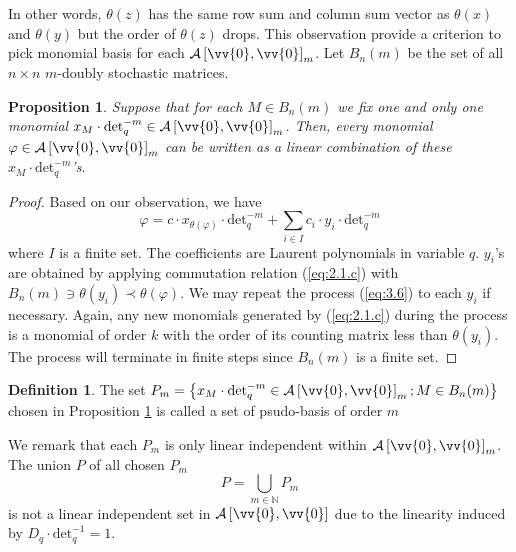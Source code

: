 \documentclass[table,a4paper,reqno]{amsart}
\numberwithin{equation}{section}
\newtheorem{proposition}[theorem]{Proposition}
\theoremstyle{definition}
\newtheorem{definition}[theorem]{Definition}
\begin{document}
\noindent In other words, $\theta(z)$ has the same row sum and column sum vector as $\theta(x)$ and $\theta(y)$ but the order of $\theta(z)$ drops. This observation provide a criterion to pick monomial basis for each $\mathcal{A}\left[\vv{0},\vv{0}\right]_m$. Let $B_n(m)$ be the set of all $n\times n$ $m$-doubly stochastic matrices.
\begin{proposition}\label{prop:3.5}
    Suppose that for each $M\in B_n(m)$ we fix one and only one monomial $x_M\cdot\text{det}_q^{-m}\in \mathcal{A}\left[\vv{0},\vv{0}\right]_m$. Then, every monomial $\varphi\in \mathcal{A}\left[\vv{0},\vv{0}\right]_m$ can be written as a linear combination of these $x_M\cdot\text{det}_q^{-m}$'s.
\end{proposition}
\begin{proof}
    Based on our observation, we have
    \begin{equation}\label{eq:3.6}
        \varphi=c\cdot x_{\theta(\varphi)}\cdot\text{det}_q^{-m}+\sum_{i\in I}c_i\cdot y_i\cdot\text{det}_q^{-m}
    \end{equation}
    where $I$ is a finite set. The coefficients are Laurent polynomials in variable $q$. $y_i$'s are obtained by applying commutation relation (\ref{eq:2.1.c}) with $B_n(m)\ni\theta(y_i)\prec\theta(\varphi)$. We may repeat the process (\ref{eq:3.6}) to each $y_i$ if necessary. Again, any new monomials generated by (\ref{eq:2.1.c}) during the process is a monomial of order $k$ with the order of its counting matrix less than $\theta(y_i)$. The process will terminate in finite steps since $B_n(m)$ is a finite set.
\end{proof}
\begin{definition}\label{def:3.6}
    The set $P_m=\left\{x_M\cdot\text{det}_q^{-m}\in \mathcal{A}\left[\vv{0},\vv{0}\right]_m; M\in B_n(m)\right\}$ chosen in Proposition \ref{prop:3.5} is called a set of psudo-basis of order $m$
\end{definition}
 We remark that each $P_m$ is only linear independent within $\mathcal{A}\left[\vv{0},\vv{0}\right]_m$. The union $P$ of all chosen $P_m$
\begin{equation}
    P=\bigcup_{m\in\mathbb{N}} P_m\label{eq:3.7}
\end{equation}
is not a linear independent set in $\mathcal{A}\left[\vv{0},\vv{0}\right]$ due to the linearity induced by $D_q\cdot\text{det}_q^{-1}=1$.
\end{document}
